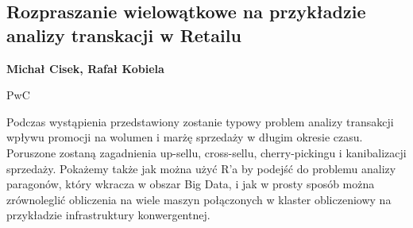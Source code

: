 \documentclass[\main/boa.tex]{subfiles}
\begin{document}
\subsection{Rozpraszanie wielowątkowe na przykładzie analizy transkacji w Retailu}

\begin{minipage}{0.915\textwidth}
	\centering
  {\bf {} Michał Cisek,  Rafał Kobiela}
\end{minipage}


\begin{affiliations}
\begin{minipage}{0.915\textwidth}
\centering
PwC \\[-2pt]
\end{minipage}
\end{affiliations}

\vskip 0.3cm

 Podczas wystąpienia przedstawiony zostanie typowy problem analizy transakcji wpływu promocji na wolumen i marżę sprzedaży w długim okresie czasu. Poruszone zostaną zagadnienia up-sellu, cross-sellu, cherry-pickingu i kanibalizacji sprzedaży. Pokażemy także jak można użyć R'a by podejść do problemu analizy paragonów, który wkracza w obszar Big Data, i jak w prosty sposób można zrównoleglić obliczenia na wiele maszyn połączonych w klaster obliczeniowy na przykładzie infrastruktury konwergentnej. 
\end{document}
